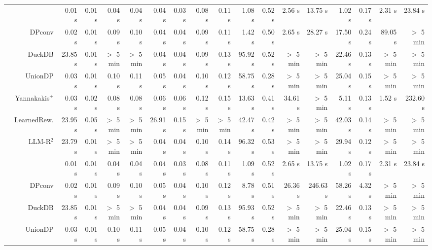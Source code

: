 \begin{table}
\begin{tiny}
\begin{tabular}{cr|rrrr|rrrr|rrrr|rrrr}
    \hline
        & \sys{}  & 0.01 s & 0.01 s & 0.04 s & 0.04 s & 0.04 s & 0.03 s & 0.08 s & 0.11 s & 1.08 s & 0.52 s & 2.56 s & 13.75 s & 1.02 s & 0.17 s & 2.31 s & 23.84 s \\
        & DPconv  & 0.02 s & 0.01 s & 0.09 s & 0.10 s & 0.04 s & 0.04 s & 0.09 s & 0.11 s & 1.42 s & 0.50 s & 2.65 s & 28.27 s & 17.50 s & 0.24 s & 89.05 s & $>$ 5 min \\
        & DuckDB  & 23.85 s & 0.01 s & $>$ 5 min & $>$ 5 min & 0.04 s & 0.04 s & 0.09 s & 0.13 s & 95.92 s & 0.52 s & $>$ 5 min & $>$ 5 min & 22.46 s & 0.13 s & $>$ 5 min & $>$ 5 min \\
        & UnionDP  & 0.03 s & 0.01 s & 0.10 s & 0.11 s & 0.05 s & 0.04 s & 0.10 s & 0.12 s & 58.75 s & 0.28 s & $>$ 5 min & $>$ 5 min & 25.04 s & 0.15 s & $>$ 5 min & $>$ 5 min \\
        & Yannakakis$^+$  & 0.03 s & 0.02 s & 0.08 s & 0.08 s & 0.06 s & 0.06 s & 0.12 s & 0.15 s & 13.63 s & 0.41 s & 34.61 s & $>$ 5 min & 5.11 s & 0.13 s & 1.52 s & 232.60 s \\
        & LearnedRew.  & 23.95 s & 0.05 s & $>$ 5 min & $>$ 5 min & 26.91 s & 0.15 s & $>$ 5 min & $>$ 5 min & 42.47 s & 0.42 s & $>$ 5 min & $>$ 5 min & 42.03 s & 0.14 s & $>$ 5 min & $>$ 5 min \\
        & LLM-R$^2$  & 23.79 s & 0.01 s & $>$ 5 min & $>$ 5 min & 0.04 s & 0.04 s & 0.10 s & 0.14 s & 96.32 s & 0.53 s & $>$ 5 min & $>$ 5 min & 29.94 s & 0.12 s & $>$ 5 min & $>$ 5 min \\
    \hline
        & \sys{}  & 0.01 s & 0.01 s & 0.04 s & 0.04 s & 0.04 s & 0.03 s & 0.08 s & 0.11 s & 1.09 s & 0.52 s & 2.65 s & 13.75 s & 1.02 s & 0.17 s & 2.31 s & 23.84 s \\
        & DPconv  & 0.02 s & 0.01 s & 0.09 s & 0.10 s & 0.05 s & 0.04 s & 0.10 s & 0.12 s & 8.78 s & 0.51 s & 26.36 s & 246.63 s & 58.26 s & 4.32 s & $>$ 5 min & $>$ 5 min \\
        & DuckDB  & 23.85 s & 0.01 s & $>$ 5 min & $>$ 5 min & 0.04 s & 0.04 s & 0.09 s & 0.13 s & 95.93 s & 0.52 s & $>$ 5 min & $>$ 5 min & 22.46 s & 0.13 s & $>$ 5 min & $>$ 5 min \\
        & UnionDP  & 0.03 s & 0.01 s & 0.10 s & 0.11 s & 0.05 s & 0.04 s & 0.10 s & 0.12 s & 58.75 s & 0.28 s & $>$ 5 min & $>$ 5 min & 25.04 s & 0.15 s & $>$ 5 min & $>$ 5 min \\

\end{tabular}
\end{tiny}
\end{table}
